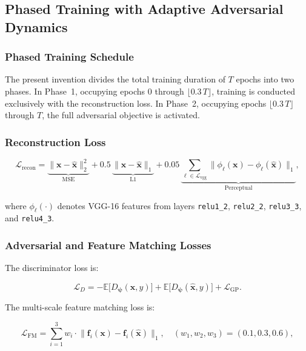 \documentclass[12pt,letterpaper]{article}
\newcommand{\bx}{\mathbf{x}}
\newcommand{\bpsi}{\bm{\psi}}
\newcommand{\EE}{\mathbb{E}}
\begin{document}
\subsection{Phased Training with Adaptive Adversarial Dynamics}

\subsubsection{Phased Training Schedule}

The present invention divides the total training duration of $T$ epochs into
two phases.  In Phase~1, occupying epochs $0$ through $\lfloor 0.3\,T
\rfloor$, training is conducted exclusively with the reconstruction loss.
In Phase~2, occupying epochs $\lfloor 0.3\,T \rfloor$ through $T$, the full
adversarial objective is activated.

\subsubsection{Reconstruction Loss}

\begin{equation}
  \mathcal{L}_{\text{recon}} =
    \underbrace{\|\bx - \hat{\bx}\|_2^2}_{\text{MSE}} +
    0.5\,\underbrace{\|\bx - \hat{\bx}\|_1}_{\text{L1}} +
    0.05\,\underbrace{\sum_{\ell \in \mathcal{L}_{\text{vgg}}}
      \|\phi_\ell(\bx) - \phi_\ell(\hat{\bx})\|_1}_{\text{Perceptual}},
  \label{eq:recon}
\end{equation}

where $\phi_\ell(\cdot)$ denotes VGG-16 features from layers
\texttt{relu1\_2}, \texttt{relu2\_2}, \texttt{relu3\_3}, and
\texttt{relu4\_3}.

\subsubsection{Adversarial and Feature Matching Losses}

The discriminator loss is:

\begin{equation}
  \mathcal{L}_D = -\EE\!\bigl[D_{\bpsi}(\bx, y)\bigr]
    + \EE\!\bigl[D_{\bpsi}(\hat{\bx}, y)\bigr]
    + \mathcal{L}_{\text{GP}}.
  \label{eq:disc}
\end{equation}

The multi-scale feature matching loss is:

\begin{equation}
  \mathcal{L}_{\text{FM}} = \sum_{i=1}^{3}
    w_i \cdot \bigl\|\mathbf{f}_i(\bx) - \mathbf{f}_i(\hat{\bx})\bigr\|_1,
  \quad
  (w_1, w_2, w_3) = (0.1, 0.3, 0.6),
  \label{eq:fm}
\end{equation}
\end{document}
